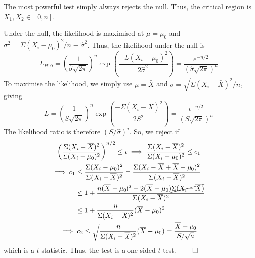 \documentclass[twocolumn]{article}
\begin{document}
The most powerful test simply always rejects the null. Thus, the critical region is $X_1,X_2\in [0,n]$.


Under the null, the likelihood is maximised at $\mu=\mu_0$ and $\sigma^2=\Sigma(X_i-\mu_0)^2/n\equiv\hat\sigma^2$.
Thus, the likelihood under the null is\[
L_{H,0}=\left(\frac{1}{\hat\sigma\sqrt{2\pi}}
\right)^n\exp\left(
\frac{-\Sigma(X_i-\mu_0)^2}{2\hat\sigma^2}
\right)=\frac{e^{-n/2}}{(\hat\sigma\sqrt{2\pi})^n}
\]
To maximise the likelihood, we simply use $\mu=\bar X$ and $\sigma=\sqrt{\Sigma(X_i-\bar X)^2/n}$, giving \[
L=\left(\frac{1}{S\sqrt{2\pi}}
\right)^n\exp\left(
\frac{-\Sigma(X_i-\bar X)^2}{2S^2}
\right)=\frac{e^{-n/2}}{(S\sqrt{2\pi})^n}
\]
The likelihood ratio is therefore $(S/\hat\sigma)^n$. So, we reject if\begin{gather*}
\left(\frac{\Sigma (X_i-\bar X)^2}{\Sigma(X_i-\mu_0)^2}\right)^{n/2}\le c \implies \frac{\Sigma (X_i-\bar X)^2}{\Sigma(X_i-\mu_0)^2} \le c_1\\
\begin{aligned}
\implies c_1&\le \frac{\Sigma(X_i-\mu_0)^2}{\Sigma (X_i-\bar X)^2}
=\frac{\Sigma(X_i-\bar X+\bar X-\mu_0)^2}{\Sigma (X_i-\bar X)^2}\\
&\le1+\frac{n(\bar X-\mu_0)^2-2(\bar X-\mu_0)\cancel{\Sigma(X_i-\bar X)}}{\Sigma (X_i-\bar X)^2}\\
&\le 1+\frac{n}{\Sigma (X_i-\bar X)^2} (\bar X-\mu_0)^2\\
\end{aligned}\\
\implies c_2\le\sqrt{\frac{n}{\Sigma (X_i-\bar X)^2}}(\bar X-\mu_0)
=\frac{\bar X-\mu_0}{S/\sqrt{n}}
\end{gather*}
which is a $t$-statistic. Thus, the test is a one-sided $t$-test. $\qed$
\end{document}
